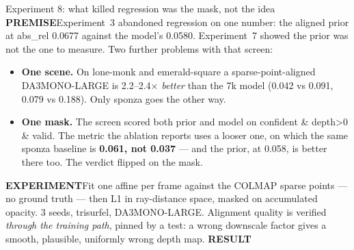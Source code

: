 \documentclass[aspectratio=169,9pt]{beamer}
\makeatletter
\newcommand{\up}[1]{\textcolor{good}{#1}}
\newcommand{\dn}[1]{\textcolor{bad}{#1}}
\newcommand{\code}[1]{{\ttfamily\fontsize{0.92\f@size}{\f@baselineskip}\selectfont #1}}
\newcommand{\lbl}[1]{\textcolor{lblcol}{\scriptsize\bfseries #1}\hspace{0.5em}}
\newcommand{\pre}{\lbl{PREMISE}}
\newcommand{\expt}{\lbl{EXPERIMENT}}
\newcommand{\res}{\lbl{RESULT}}
\makeatother
\begin{document}
\begin{frame}{Experiment 8: what killed regression was the mask, not the idea}
  \pre Experiment~3 abandoned regression on one number: the aligned prior at \code{abs\_rel}
  0.0677 against the model's 0.0580. Experiment~7 showed the prior was not the one to measure.
  Two further problems with that screen:
  \begin{itemize}\small
    \item \textbf{One scene.} On \code{lone-monk} and \code{emerald-square} a sparse-point-aligned
          \code{DA3MONO-LARGE} is \up{2.2--2.4$\times$ \emph{better}} than the 7k model
          (0.042 vs 0.091, 0.079 vs 0.188). Only \code{sponza} goes the other way.
    \item \textbf{One mask.} The screen scored both prior and model on
          \code{confident \& depth>0 \& valid}. The metric the ablation reports uses a looser
          one, on which the same \code{sponza} baseline is \textbf{0.061, not 0.037} --- and the
          prior, at 0.058, is better there too. \dn{The verdict flipped on the mask.}
  \end{itemize}

  \expt Fit one affine per frame against the COLMAP sparse points --- no ground truth --- then
  L1 in ray-distance space, masked on accumulated opacity. 3 seeds, \code{trisurfel},
  \code{DA3MONO-LARGE}. Alignment quality is verified \emph{through the training path}, pinned by
  a test: a wrong downscale factor gives a smooth, plausible, uniformly wrong depth map.
  \vspace{-0.2em}
  \res
  \begin{center}\scriptsize
    
  \end{center}
\end{frame}
\end{document}
